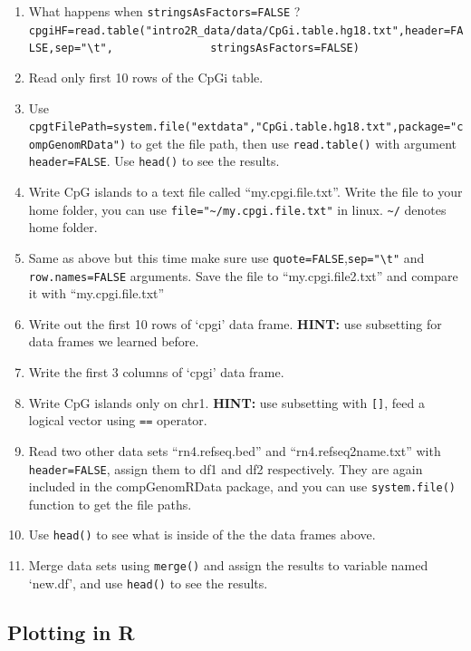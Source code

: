 \documentclass[12pt,]{krantz}
\theoremstyle{definition}
\theoremstyle{definition}
\theoremstyle{definition}
\theoremstyle{remark}
\begin{document}
\begin{enumerate}
\def\labelenumi{\arabic{enumi}.}
\setcounter{enumi}{42}
\item
  What happens when \texttt{stringsAsFactors=FALSE} ?
  \texttt{cpgiHF=read.table("intro2R\_data/data/CpGi.table.hg18.txt",header=FALSE,sep="\textbackslash{}t",\ \ \ \ \ \ \ \ \ \ \ \ \ \ \ stringsAsFactors=FALSE)}
\item
  Read only first 10 rows of the CpGi table.
\item
  Use
  \texttt{cpgtFilePath=system.file("extdata","CpGi.table.hg18.txt",package="compGenomRData")}
  to get the file path, then use \texttt{read.table()} with argument
  \texttt{header=FALSE}. Use \texttt{head()} to see the results.
\item
  Write CpG islands to a text file called ``my.cpgi.file.txt''. Write
  the file to your home folder, you can use
  \texttt{file="\textasciitilde{}/my.cpgi.file.txt"} in linux.
  \texttt{\textasciitilde{}/} denotes home folder.
\item
  Same as above but this time make sure use
  \texttt{quote=FALSE},\texttt{sep="\textbackslash{}t"} and
  \texttt{row.names=FALSE} arguments. Save the file to
  ``my.cpgi.file2.txt'' and compare it with ``my.cpgi.file.txt''
\item
  Write out the first 10 rows of `cpgi' data frame. \textbf{HINT:} use
  subsetting for data frames we learned before.
\item
  Write the first 3 columns of `cpgi' data frame.
\item
  Write CpG islands only on chr1. \textbf{HINT:} use subsetting with
  \texttt{{[}{]}}, feed a logical vector using \texttt{==} operator.
\item
  Read two other data sets ``rn4.refseq.bed'' and
  ``rn4.refseq2name.txt'' with \texttt{header=FALSE}, assign them to df1
  and df2 respectively. They are again included in the compGenomRData
  package, and you can use \texttt{system.file()} function to get the
  file paths.
\item
  Use \texttt{head()} to see what is inside of the the data frames
  above.
\item
  Merge data sets using \texttt{merge()} and assign the results to
  variable named `new.df', and use \texttt{head()} to see the results.
\end{enumerate}

\hypertarget{plotting-in-r-1}{%
\subsection{Plotting in R}\label{plotting-in-r-1}}
\end{document}
